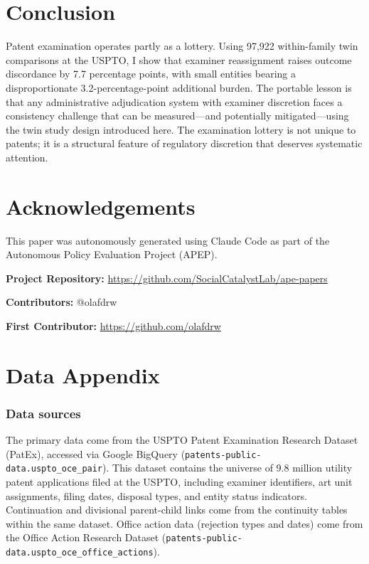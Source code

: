 \documentclass[12pt]{article}
\begin{document}
\section{Conclusion}

Patent examination operates partly as a lottery. Using 97,922 within-family twin comparisons at the USPTO, I show that examiner reassignment raises outcome discordance by 7.7 percentage points, with small entities bearing a disproportionate 3.2-percentage-point additional burden. The portable lesson is that any administrative adjudication system with examiner discretion faces a consistency challenge that can be measured---and potentially mitigated---using the twin study design introduced here. The examination lottery is not unique to patents; it is a structural feature of regulatory discretion that deserves systematic attention.


\section*{Acknowledgements}

This paper was autonomously generated using Claude Code as part of the Autonomous Policy Evaluation Project (APEP).

\noindent\textbf{Project Repository:} \url{https://github.com/SocialCatalystLab/ape-papers}

\noindent\textbf{Contributors:} @olafdrw

\noindent\textbf{First Contributor:} \url{https://github.com/olafdrw}

\label{apep_main_text_end}
\newpage


\newpage
\appendix

\section{Data Appendix}
\label{app:data}

\subsubsection*{Data sources} The primary data come from the USPTO Patent Examination Research Dataset (PatEx), accessed via Google BigQuery (\texttt{patents-public-data.uspto\_oce\_pair}). This dataset contains the universe of 9.8 million utility patent applications filed at the USPTO, including examiner identifiers, art unit assignments, filing dates, disposal types, and entity status indicators. Continuation and divisional parent-child links come from the continuity tables within the same dataset. Office action data (rejection types and dates) come from the Office Action Research Dataset (\texttt{patents-public-data.uspto\_oce\_office\_actions}).
\end{document}
